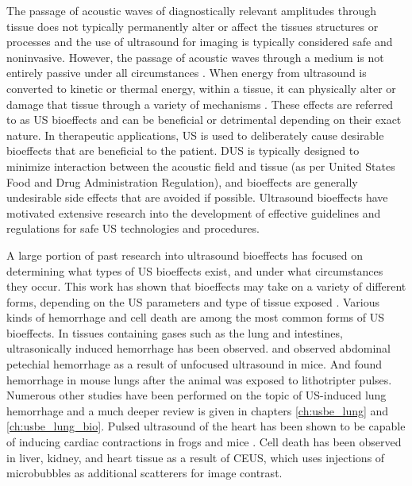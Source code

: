 The passage of acoustic waves of diagnostically relevant amplitudes
through tissue does not typically permanently alter or affect the
tissues structures or processes and the use of ultrasound for imaging
is typically considered safe and noninvasive. However, the passage of
acoustic waves through a medium is not entirely passive under all
circumstances \citep{Nyborg2001}. When energy from ultrasound is
converted to kinetic or thermal energy, within a tissue, it can
physically alter or damage that tissue through a variety of mechanisms
\citep{OBrien2007}. These effects are referred to as \ac{US}
bioeffects and can be beneficial or detrimental depending on their
exact nature. In therapeutic applications, \ac{US} is used to
deliberately cause desirable bioeffects that are beneficial to the
patient. \ac{DUS} is typically designed to minimize interaction
between the acoustic field and tissue \citep{Dalecki2004} (as per
United States Food and Drug Administration Regulation), and bioeffects
are generally undesirable side effects that are avoided if
possible. Ultrasound bioeffects have motivated extensive research into
the development of effective guidelines and regulations for safe
\ac{US} technologies and procedures.

A large portion of past research into ultrasound bioeffects has
focused on determining what types of \ac{US} bioeffects exist, and
under what circumstances they occur. This work has shown that
bioeffects may take on a variety of different forms, depending on the
\ac{US} parameters and type of tissue exposed
\citep{NCRP2002}. Various kinds of hemorrhage and cell death are among
the most common forms of \ac{US} bioeffects. In tissues containing
gases such as the lung and intestines, ultrasonically induced
hemorrhage has been observed. \cite{Lehmann1953} and \cite{Miller1994}
observed abdominal petechial hemorrhage as a result of unfocused
ultrasound in mice. And \cite{Child1990} found hemorrhage in mouse
lungs after the animal was exposed to lithotripter pulses. Numerous
other studies have been performed on the topic of US-induced lung
hemorrhage and a much deeper review is given in chapters
\ref{ch:usbe_lung} and \ref{ch:usbe_lung_bio}. Pulsed ultrasound of
the heart has been shown to be capable of inducing cardiac
contractions in frogs and mice \citep{Dalecki1993,MacRobbie1997}. Cell
death has been observed in liver, kidney, and heart tissue as a result
of \ac{CEUS}, which uses injections of microbubbles as
additional scatterers for image contrast\cite{Skyba1998, Miller2008a}.

